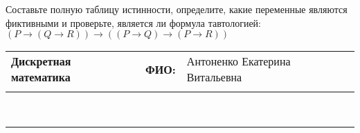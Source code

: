 \documentclass[10pt]{exam}
\newcommand{\class}{Дискретная математика}
\newcommand{\examdate}{}
\begin{document}
\begin{questions}
\begin{enumerate}[a)]
\end{enumerate}\question Составьте полную таблицу истинности, определите, какие переменные являются фиктивными и проверьте, является ли формула тавтологией:
$(P \rightarrow (Q \rightarrow R)) \rightarrow ((P \rightarrow Q) \rightarrow (P \rightarrow R))$

\end{questions}
\newpage
\begin{flushright}
\begin{tabular}{p{2.8in} r l}
\textbf{\class} & \textbf{ФИО:} &Антоненко Екатерина Витальевна
\\

\textbf{\examdate} &&\\
\end{tabular}\\
\end{flushright}
\rule[1ex]{\textwidth}{.1pt}
\end{document}
